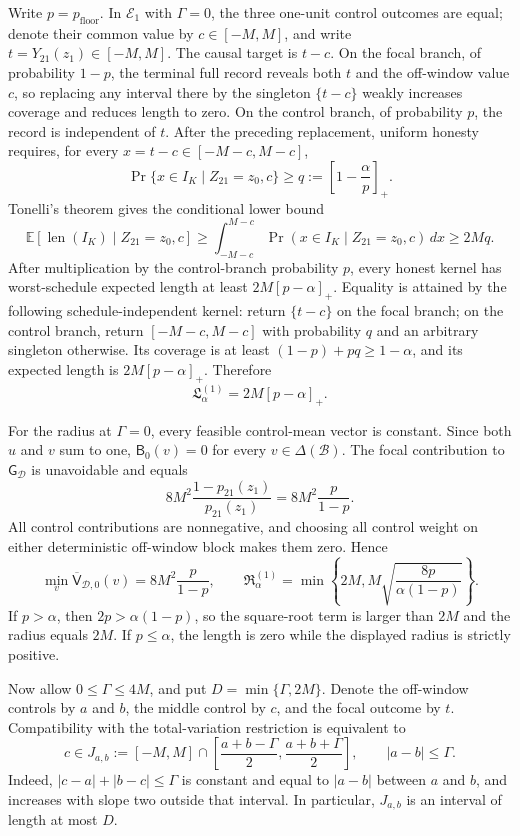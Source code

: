 Write \(p=p_{\mathrm{floor}}\).  In \(\mathcal E_1\) with \(\Gamma=0\), the three one-unit control outcomes are equal; denote their common value by \(c\in[-M,M]\), and write \(t=Y_{21}(z_1)\in[-M,M]\).  The causal target is \(t-c\).  On the focal branch, of probability \(1-p\), the terminal full record reveals both \(t\) and the off-window value \(c\), so replacing any interval there by the singleton \(\{t-c\}\) weakly increases coverage and reduces length to zero.  On the control branch, of probability \(p\), the record is independent of \(t\).  After the preceding replacement, uniform honesty requires, for every \(x=t-c\in[-M-c,M-c]\),
\[
 \Pr\{x\in I_K\mid Z_{21}=z_0,c\}
 \ge q:=\left[1-\frac\alpha p\right]_+.
\]
Tonelli's theorem gives the conditional lower bound
\[
 \mathbb E[\operatorname{len}(I_K)\mid Z_{21}=z_0,c]
 \ge\int_{-M-c}^{M-c}\Pr(x\in I_K\mid Z_{21}=z_0,c)\,dx
 \ge2Mq.
\]
After multiplication by the control-branch probability \(p\), every honest kernel has worst-schedule expected length at least \(2M[p-\alpha]_+\).  Equality is attained by the following schedule-independent kernel: return \(\{t-c\}\) on the focal branch; on the control branch, return \([-M-c,M-c]\) with probability \(q\) and an arbitrary singleton otherwise.  Its coverage is at least \((1-p)+pq\ge1-\alpha\), and its expected length is \(2M[p-\alpha]_+\).  Therefore
\[
 \mathfrak L_\alpha^{(1)}=2M[p-\alpha]_+.
\]

For the radius at \(\Gamma=0\), every feasible control-mean vector is constant.  Since both \(u\) and \(v\) sum to one, \(\mathsf B_0(v)=0\) for every \(v\in\Delta(\mathcal B)\).  The focal contribution to \(\mathsf G_{\mathcal D}\) is unavoidable and equals
\[
 8M^2\frac{1-p_{21}(z_1)}{p_{21}(z_1)}
 =8M^2\frac p{1-p}.
\]
All control contributions are nonnegative, and choosing all control weight on either deterministic off-window block makes them zero.  Hence
\[
 \min_v\overline{\mathsf V}_{\mathcal D,0}(v)
 =8M^2\frac p{1-p},
 \qquad
 \mathfrak R_\alpha^{(1)}
 =\min\left\{2M,M\sqrt{\frac{8p}{\alpha(1-p)}}\right\}.
\]
If \(p>\alpha\), then \(2p>\alpha(1-p)\), so the square-root term is larger than \(2M\) and the radius equals \(2M\).  If \(p\le\alpha\), the length is zero while the displayed radius is strictly positive.

Now allow \(0\le\Gamma\le4M\), and put \(D=\min\{\Gamma,2M\}\).  Denote the off-window controls by \(a\) and \(b\), the middle control by \(c\), and the focal outcome by \(t\).  Compatibility with the total-variation restriction is equivalent to
\[
 c\in J_{a,b}:=[-M,M]\cap
 \left[\frac{a+b-\Gamma}{2},\frac{a+b+\Gamma}{2}\right],
 \qquad |a-b|\le\Gamma.
\]
Indeed, \(|c-a|+|b-c|\le\Gamma\) is constant and equal to \(|a-b|\) between \(a\) and \(b\), and increases with slope two outside that interval.  In particular, \(J_{a,b}\) is an interval of length at most \(D\).

